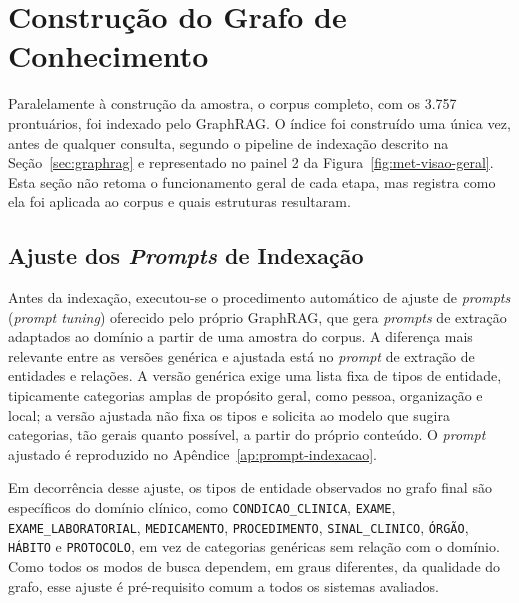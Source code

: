 \section{Construção do Grafo de Conhecimento}\label{sec:met-grafo}

Paralelamente à construção da amostra, o corpus completo, com os 3.757 prontuários, foi indexado pelo GraphRAG. O índice foi construído uma única vez, antes de qualquer consulta, segundo o pipeline de indexação descrito na Seção~\ref{sec:graphrag} e representado no painel 2 da Figura~\ref{fig:met-visao-geral}. Esta seção não retoma o funcionamento geral de cada etapa, mas registra como ela foi aplicada ao corpus e quais estruturas resultaram.

\subsection{Ajuste dos \texorpdfstring{\textit{Prompts}}{Prompts} de Indexação}\label{sec:met-prompt-tuning}

Antes da indexação, executou-se o procedimento automático de ajuste de \textit{prompts} (\textit{prompt tuning}) oferecido pelo próprio GraphRAG, que gera \textit{prompts} de extração adaptados ao domínio a partir de uma amostra do corpus. A diferença mais relevante entre as versões genérica e ajustada está no \textit{prompt} de extração de entidades e relações. A versão genérica exige uma lista fixa de tipos de entidade, tipicamente categorias amplas de propósito geral, como pessoa, organização e local; a versão ajustada não fixa os tipos e solicita ao modelo que sugira categorias, tão gerais quanto possível, a partir do próprio conteúdo. O \textit{prompt} ajustado é reproduzido no Apêndice~\ref{ap:prompt-indexacao}.

Em decorrência desse ajuste, os tipos de entidade observados no grafo final são específicos do domínio clínico, como \texttt{CONDICAO\_CLINICA}, \texttt{EXAME}, \texttt{EXAME\_LABORATORIAL}, \texttt{MEDICAMENTO}, \texttt{PROCEDIMENTO}, \texttt{SINAL\_CLINICO}, \texttt{ÓRGÃO}, \texttt{HÁBITO} e \texttt{PROTOCOLO}, em vez de categorias genéricas sem relação com o domínio. Como todos os modos de busca dependem, em graus diferentes, da qualidade do grafo, esse ajuste é pré-requisito comum a todos os sistemas avaliados.

